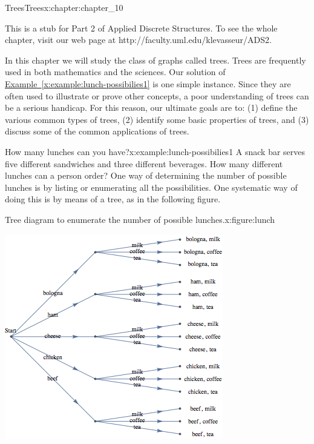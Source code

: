 \documentclass[oneside,10pt,]{book}
\newcommand{\xreffont}{\relax}
\numberwithin{equation}{section}
\begin{document}
\begin{chapterptx}{Trees}{}{Trees}{}{}{x:chapter:chapter_10}
\begin{introduction}{}%
This is a stub for Part 2 of Applied Discrete Structures. To see the whole chapter, visit our web page at http:\slash{}\slash{}faculty.uml.edu\slash{}klevasseur\slash{}ADS2.%
\par
In this chapter we will study the class of graphs called trees. Trees are frequently used in both mathematics and the sciences. Our solution of \hyperref[x:example:lunch-possibilies1]{Example~{\xreffont\ref{x:example:lunch-possibilies1}}} is one simple instance. Since they are often used to illustrate or prove other concepts, a poor understanding of trees can be a serious handicap. For this reason, our ultimate goals are to: (1) define the various common types of trees, (2) identify some basic properties of trees, and (3) discuss some of the common applications of trees.%
\end{introduction}%
\begin{example}{How many lunches can you have?}{x:example:lunch-possibilies1}%
A snack bar serves five different sandwiches and three different beverages. How many different lunches can a person order? One way of determining the number of possible lunches is by listing or enumerating all the possibilities. One systematic way of doing this is by means of a tree, as in the following figure.%
\begin{figureptx}{Tree diagram to enumerate the number of possible lunches.}{x:figure:lunch}{}%
\begin{image}{0.25}{0.5}{0.25}%
\includegraphics[width=\linewidth]{images/lunch.png}

\end{image}
\end{figureptx}
\end{example}
\end{chapterptx}
\end{document}
